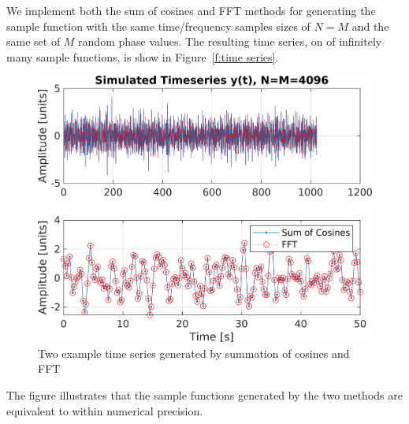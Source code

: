 \documentclass[11pt]{article}
\begin{document}
We implement both the sum of cosines and FFT methods for generating the sample function with the same time/frequency samples sizes of $N=M$ and the same set of $M$ random phase values.  The resulting time series, on of infinitely many sample functions, is show in Figure~\ref{f:time series}. 
\begin{figure}[hbt!]
  \centering
  \includegraphics[width=\FigWidth\textwidth]{images/timeseries.png}
  \caption{Two example time series generated by summation of cosines and FFT}
  \label{f:timeseries}
\end{figure}
The figure illustrates that the sample functions generated by the two methods are equivalent to within numerical precision.
\end{document}
